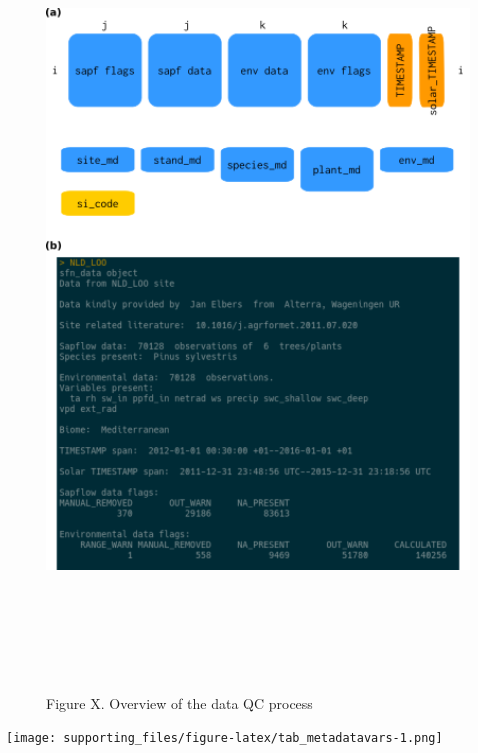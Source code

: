 \documentclass[]{article}
\begin{document}
\begin{figure}

{\centering \includegraphics[height=800px]{resources/schematics} 

}

\caption{Figure X. Overview of the data QC process}\label{fig:fig_sfn_data}
\end{figure}

\pagebreak

\texttt{[image: supporting\_files/figure-latex/tab\_metadatavars-1.png]}
\pagebreak
\end{document}

